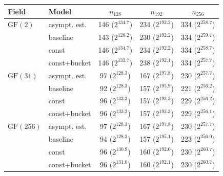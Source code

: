\begin{tabular}{llccc}
\toprule
Field & Model & $n_{128}$ & $n_{192}$ & $n_{256}$ \\
\midrule
$\mathrm{GF}(2)$ & asympt. est. & 146 ($2^{134.7}$) & 234 ($2^{192.2}$) & 334 ($2^{258.7}$) \\
 & baseline & 143 ($2^{128.2}$) & 230 ($2^{192.2}$) & 334 ($2^{259.7}$) \\
 & const & 146 ($2^{134.7}$) & 234 ($2^{192.2}$) & 334 ($2^{258.7}$) \\
 & const+bucket & 146 ($2^{133.7}$) & 238 ($2^{192.1}$) & 334 ($2^{257.7}$) \\
\midrule
$\mathrm{GF}(31)$ & asympt. est. & 97 ($2^{128.3}$) & 167 ($2^{197.8}$) & 230 ($2^{257.7}$) \\
 & baseline & 92 ($2^{128.3}$) & 157 ($2^{195.9}$) & 221 ($2^{256.2}$) \\
 & const & 96 ($2^{133.3}$) & 157 ($2^{193.3}$) & 229 ($2^{256.2}$) \\
 & const+bucket & 96 ($2^{133.2}$) & 157 ($2^{193.3}$) & 229 ($2^{256.1}$) \\
\midrule
$\mathrm{GF}(256)$ & asympt. est. & 97 ($2^{128.3}$) & 167 ($2^{197.8}$) & 230 ($2^{257.7}$) \\
 & baseline & 94 ($2^{128.3}$) & 157 ($2^{195.1}$) & 223 ($2^{256.0}$) \\
 & const & 96 ($2^{130.9}$) & 160 ($2^{192.0}$) & 230 ($2^{260.7}$) \\
 & const+bucket & 96 ($2^{131.0}$) & 160 ($2^{192.1}$) & 230 ($2^{260.7}$) \\
\bottomrule
\end{tabular}
